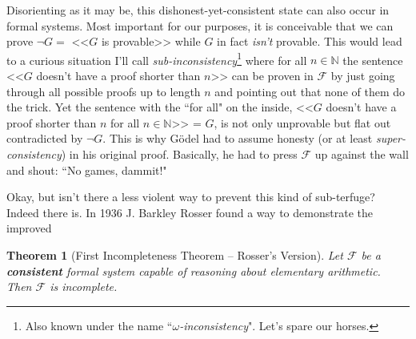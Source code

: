 \documentclass{article}
\newtheorem{theorem}{Theorem}
\newcommand{\F}{\ensuremath{\mathcal{F}}}
\begin{document}
Disorienting as it may be, this dishonest-yet-consistent state can also occur in formal systems. Most important for our purposes, it is conceivable that we can prove $\neg G =$ <<$G$ is provable>> while $G$ in fact \textit{isn't} provable. This would lead to a curious situation I'll call \textit{sub-inconsistency}\footnote{Also known under the name ``\textit{$\omega$-inconsistency}". Let's spare our horses.} where for all $n\in\mathbb{N}$ the sentence <<$G$ doesn't have a proof shorter than $n$>> can be proven in $\F$ by just going through all possible proofs up to length $n$ and pointing out that none of them do the trick. Yet the sentence with the ``for all" on the inside, <<$G$ doesn't have a proof shorter than $n$ for all $n\in\mathbb{N}$>> = $G$, is not only unprovable but flat out contradicted by $\neg G$. This is why Gödel had to assume honesty (or at least \textit{super-consistency}) in his original proof. Basically, he had to press $\F$ up against the wall and shout: ``No games, dammit!"

Okay, but isn't there a less violent way to prevent this kind of sub-terfuge? Indeed there is. In 1936 J. Barkley Rosser found a way to demonstrate the improved

\begin{theorem}[First Incompleteness Theorem -- Rosser's Version]
Let $\F$ be a \textbf{consistent} formal system capable of reasoning about elementary arithmetic. Then $\F$ is incomplete.
\end{theorem}
\end{document}
